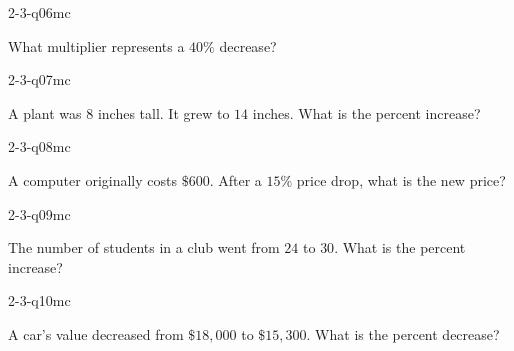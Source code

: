 \begin{practiceQuestion}{2-3-q06}{mc}
\begin{questionText}
What multiplier represents a $40\%$ decrease?
\end{questionText}
\end{practiceQuestion}

\begin{practiceQuestion}{2-3-q07}{mc}
\begin{questionText}
A plant was $8$ inches tall. It grew to $14$ inches. What is the percent increase?
\end{questionText}
\end{practiceQuestion}

\begin{practiceQuestion}{2-3-q08}{mc}
\begin{questionText}
A computer originally costs $\$600$. After a $15\%$ price drop, what is the new price?
\end{questionText}
\end{practiceQuestion}

\begin{practiceQuestion}{2-3-q09}{mc}
\begin{questionText}
The number of students in a club went from $24$ to $30$. What is the percent increase?
\end{questionText}
\end{practiceQuestion}

\begin{practiceQuestion}{2-3-q10}{mc}
\begin{questionText}
A car's value decreased from $\$18{,}000$ to $\$15{,}300$. What is the percent decrease?
\end{questionText}
\end{practiceQuestion}

